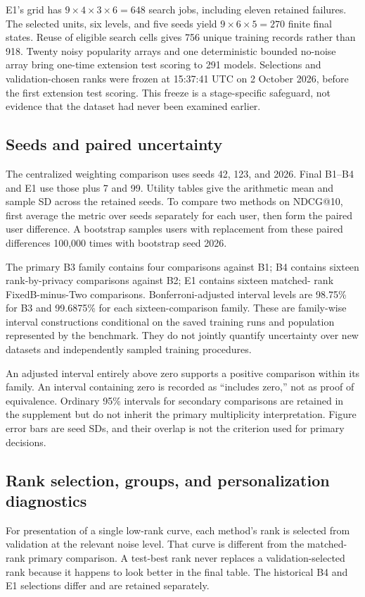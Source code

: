 E1's grid has $9\times4\times3\times6=648$ search jobs, including eleven
retained failures. The selected units, six levels, and five seeds yield
$9\times6\times5=270$ finite final states. Reuse of eligible search cells
gives 756 unique training records rather than 918. Twenty noisy popularity
arrays and one deterministic bounded no-noise array bring one-time extension
test scoring to 291 models. Selections and validation-chosen ranks were frozen
at 15:37:41 UTC on 2 October 2026, before the first extension test scoring.
This freeze is a stage-specific safeguard, not evidence that the dataset had
never been examined earlier.

\subsection{Seeds and paired uncertainty}
The centralized weighting comparison uses seeds 42, 123, and 2026. Final
B1--B4 and E1 use those plus 7 and 99. Utility tables give the arithmetic mean
and sample SD across the retained seeds. To compare two methods on NDCG@10,
first average the metric over seeds separately for each user, then form the
paired user difference. A bootstrap samples users with replacement from
these paired differences 100,000 times with bootstrap seed 2026.

The primary B3 family contains four comparisons against B1; B4 contains
sixteen rank-by-privacy comparisons against B2; E1 contains sixteen matched-
rank FixedB-minus-Two comparisons. Bonferroni-adjusted interval levels are
98.75\% for B3 and 99.6875\% for each sixteen-comparison family. These are
family-wise interval constructions conditional on the saved training runs
and population represented by the benchmark. They do not jointly quantify
uncertainty over new datasets and independently sampled training procedures.

An adjusted interval entirely above zero supports a positive comparison within
its family. An interval containing zero is recorded as ``includes zero,''
not as proof of equivalence. Ordinary 95\% intervals for secondary comparisons
are retained in the supplement but do not inherit the primary multiplicity
interpretation. Figure error bars are seed SDs, and their overlap is not the
criterion used for primary decisions.

\subsection{Rank selection, groups, and personalization diagnostics}
For presentation of a single low-rank curve, each method's rank is selected
from validation at the relevant noise level. That curve is different from
the matched-rank primary comparison. A test-best rank never replaces a
validation-selected rank because it happens to look better in the final table.
The historical B4 and E1 selections differ and are retained separately.

